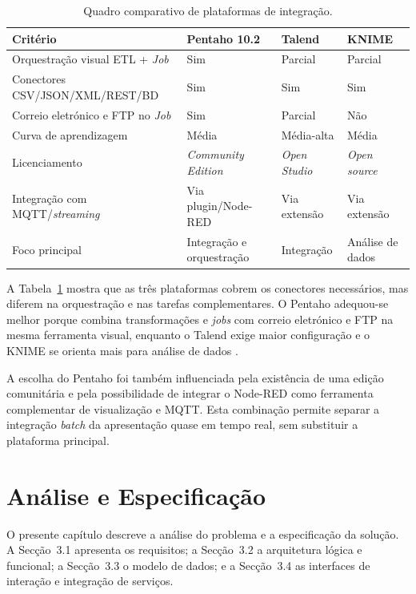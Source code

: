 \documentclass[11pt,a4paper]{article}
\begin{document}
\begin{table}[H]
\centering
\small
\begin{tabular}{|p{4.2cm}|p{3.2cm}|p{3.2cm}|p{3.2cm}|}
\hline
Critério & Pentaho 10.2 & Talend & KNIME \\ \hline
Orquestração visual ETL + \textit{Job} & Sim & Parcial & Parcial \\ \hline
Conectores CSV/JSON/XML/REST/BD & Sim & Sim & Sim \\ \hline
Correio eletrónico e FTP no \textit{Job} & Sim & Parcial & Não \\ \hline
Curva de aprendizagem & Média & Média-alta & Média \\ \hline
Licenciamento & \textit{Community Edition} & \textit{Open Studio} & \textit{Open source} \\ \hline
Integração com MQTT/\textit{streaming} & Via plugin/Node-RED & Via extensão & Via extensão \\ \hline
Foco principal & Integração e orquestração & Integração & Análise de dados \\ \hline
\end{tabular}
\caption{Quadro comparativo de plataformas de integração.}
\label{tab:comparativo}
\end{table}

A Tabela~\ref{tab:comparativo} mostra que as três plataformas cobrem os conectores necessários, mas diferem na orquestração e nas tarefas complementares. O Pentaho adequou-se melhor porque combina transformações e \textit{jobs} com correio eletrónico e FTP na mesma ferramenta visual, enquanto o Talend exige maior configuração e o KNIME se orienta mais para análise de dados \cite{hitachi2026pentaho,talend2026,knime2026}.

A escolha do Pentaho foi também influenciada pela existência de uma edição comunitária e pela possibilidade de integrar o Node-RED como ferramenta complementar de visualização e MQTT. Esta combinação permite separar a integração \textit{batch} da apresentação quase em tempo real, sem substituir a plataforma principal.

\section{Análise e Especificação}
O presente capítulo descreve a análise do problema e a especificação da solução. A Secção~3.1 apresenta os requisitos; a Secção~3.2 a arquitetura lógica e funcional; a Secção~3.3 o modelo de dados; e a Secção~3.4 as interfaces de interação e integração de serviços.
\end{document}
